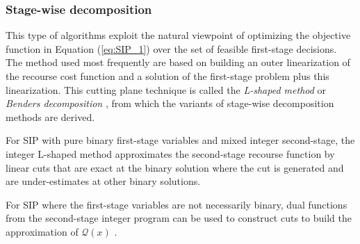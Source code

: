 \subsubsection{Stage-wise decomposition}
This type of algorithms exploit the natural viewpoint of optimizing the objective function in Equation (\ref{eq:SIP_1}) over the set of feasible first-stage decisions. The method used most frequently are based on building an outer linearization of the recourse cost function and a solution of the first-stage problem plus this linearization. This cutting plane technique is called the \textit{L-shaped method} or \textit{Benders decomposition} \cite{B1962}, from which the variants of stage-wise decomposition methods are derived.

For SIP with pure binary first-stage variables and mixed integer second-stage, the integer L-shaped method \cite{LL1993} approximates the second-stage recourse function by linear cuts that are exact at the binary solution where the cut is generated and are under-estimates at other binary solutions. 

For SIP where the first-stage variables are not necessarily binary, dual functions from the second-stage integer program can be used to construct cuts to build the approximation of $\mathcal{Q}(x)$ \cite{CT1998}.  %


